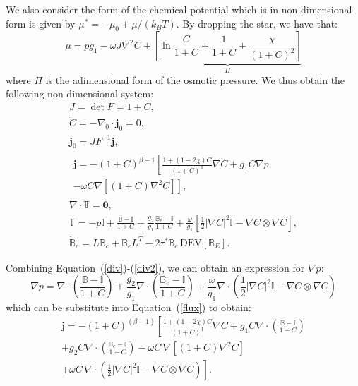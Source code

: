 \documentclass[12pt]{extarticle}
\newcommand{\B}{\ensuremath{\mathbb{B}}}
\begin{document}
We also consider the form of the chemical potential which is in non-dimensional form is given by $\mu^*=-\mu_0+\mu/(k_BT)$. By dropping the star, we have that:
\begin{equation}
\mu= p g_1 - \omega J\nabla^2 C + \underbrace{\left[\ln \frac{C}{1+C} + \frac{1}{1+C} +\frac{\chi}{(1+C)^2}\right]}_{\Pi}
\end{equation}
where $\Pi$ is the adimensional form of the osmotic pressure.
We thus obtain the following non-dimensional system:
\begin{gather}
J=\det F=1+C,\\
\dot{C} = -\nabla_0 \cdot \mathbf{j}_0 = 0,\\
\mathbf{j}_0= J F^{-1} \mathbf{j},\\[5mm]
\begin{aligned}
\mathbf{j} = -\left(1+C\right)^{\beta-1}\left[ \frac{1+(1-2\chi)C}{(1+C)^3}\nabla C +g_1 C\nabla p\right.\\
\left.-\omega C\nabla[(1+C)\nabla^2 C]\right],
\end{aligned}\label{flux}\\[5mm]
\nabla \cdot \mathbb{T} = \mathbf{0},\label{div}\\[5mm]
\mathbb{T} = -p \mathbb{I} +\frac{\B-\mathbb{I}}{1+C} +\frac{g_2}{g_1}\frac{\B_e-\mathbb{I}}{1+C}+ \frac{\omega}{g_1}\left[\frac{1}{2} |\nabla C|^2\mathbb{I}-\nabla C \otimes \nabla C\right],\label{div2}\\[5mm]
\dot{\B}_e= L \B_e +\B_e L^T - 2\tau^* \B_e \,\text{DEV}[\B_E].
\end{gather}

Combining Equation~(\ref{div})-(\ref{div2}), we can obtain an expression for $\nabla p$:
\begin{equation*}
\nabla p = \nabla \cdot \left(\frac{\B-\mathbb{I}}{1+C}\right) +\frac{g_2}{g_1} \nabla \cdot \left(\frac{\B_e-\mathbb{I}}{1+C}\right)+\frac{\omega}{g_1}\nabla \cdot \left(\frac{1}{2} |\nabla C|^2\mathbb{I}-\nabla C \otimes \nabla C\right)
\end{equation*}
which can be substitute into Equation~(\ref{flux}) to obtain:
\begin{equation}
\begin{aligned}
\mathbf{j}= -(1+C)^{(\beta-1)} \left[\frac{1+(1-2\chi)C}{(1+C)^3}\nabla C +g_1 C\nabla\cdot \left(\frac{\B-\mathbb{I}}{1+C}\right)\right.\\
\left.+g_2 C\nabla \cdot\left(\frac{\B_e-\mathbb{I}}{1+C}\right)
-\omega C \,\nabla \left[(1+C)\nabla^2 C\right]\right.\\ 
\left.+\omega C \,\nabla \cdot \left(\frac{1}{2} |\nabla C|^2\mathbb{I}-\nabla C \otimes \nabla C\right)\right].
\end{aligned}
\end{equation}
\end{document}
